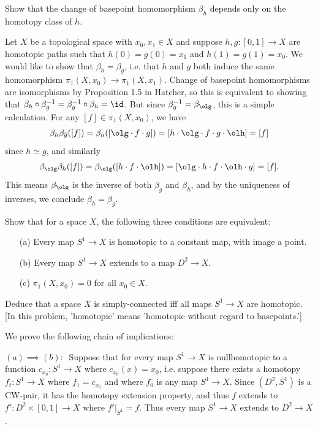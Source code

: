 \begin{homework}[e]
     Show that the change of basepoint homomorphism $\beta_h$ depends only on the homotopy class of $h$.
    \begin{prf}
        Let $X$ be a topological space with $x_0, x_1 \in X$ and suppose $h,g: [0,1] \to X$ are homotopic paths such that $h(0) = g(0) = x_1$ and $h(1) = g(1) = x_0$. We would like to show that $\beta_h = \beta_g$, i.e. that $h$ and $g$ both induce the same homomorphism $\pi_1(X,x_0) \to \pi_1(X,x_1)$. Change of basepoint homomorphisms are isomorphisms by Proposition 1.5 in Hatcher, so this is equivalent to showing that $\beta_h \circ \beta_g^{-1} = \beta_g^{-1}\circ \beta_h = \id$. But since $\beta_g^{-1} = \beta_{\olg}$, this is a simple calculation. For any $[f] \in \pi_{1}(X,x_0)$, we have
        \begin{align*}
            \beta_h\beta_{\overline{g}}([f]) = \beta_h([\olg \cdot f\cdot g]) = [h \cdot \olg \cdot f \cdot g \cdot \olh] = [f]
        \end{align*}
        since $h \simeq g$, and similarly
        \begin{align*}
            \beta_{\olg}\beta_{h}([f]) = \beta_{\olg}([h \cdot f\cdot \olh]) = [\olg \cdot h \cdot f \cdot \olh \cdot g] = [f].
        \end{align*}
        This means $\beta_{\olg}$ is the inverse of both $\beta_g$ and $\beta_h$, and by the uniqueness of inverses, we conclude $\beta_h = \beta_g$.
    \end{prf}
	 Show that for a space $X$, the following three conditions are equivalent:
	\begin{itemize}
		\item[(a)] Every map $S^1 \rightarrow X$ is homotopic to a constant map, with image a point.
		\item[(b)] Every map $S^1 \rightarrow X$ extends to a map $D^2 \rightarrow X$.
		\item[(c)] $\pi_1 (X,x_0) = 0$ for all $x_0 \in X$.
	\end{itemize}
	Deduce that a space $X$ is simply-connected iff all maps $S^1 \rightarrow X$ are homotopic. [In this problem, 'homotopic' means 'homotopic without regard to basepoints.']
	\begin{prf} We prove the following chain of implications:

	\vspace{1em}
		  $(a) \implies (b):~$ Suppose that for every map $S^1 \rightarrow X$ is nullhomotopic to a function $c_{x_0} : S^1 \rightarrow X$ where $c_{x_0}(x) = x_0$, i.e. suppose there exists a homotopy $f_t:S^1 \rightarrow X$ where $f_1 = c_{x_0}$ and where $f_0$ is any map $S^1 \rightarrow X$. Since $(D^2, S^1)$ is a CW-pair, it has the homotopy extension property, and thus $f$ extends to $f': D^2 \times [0,1] \rightarrow X$ where $f'|_{S^1} = f$. Thus every map $S^1 \rightarrow X$ extends to $D^2 \rightarrow X$.
		  

\end{prf}
\end{homework}
